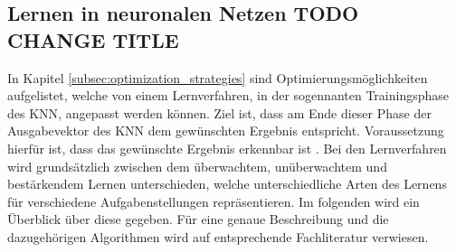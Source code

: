 \subsection{Lernen in neuronalen Netzen TODO CHANGE TITLE}
In Kapitel \ref{subsec:optimization_strategies} sind Optimierungsmöglichkeiten aufgelistet, welche von einem Lernverfahren, in der sogennanten Trainingsphase des \ac{KNN}, angepasst werden können. Ziel ist, dass am Ende dieser Phase der Ausgabevektor des \ac{KNN} dem gewünschten Ergebnis entspricht. Voraussetzung hierfür ist, dass das gewünschte Ergebnis erkennbar ist \cite{zell2003simulation}. Bei den Lernverfahren wird grundsätzlich zwischen dem überwachtem, unüberwachtem und bestärkendem Lernen unterschieden, welche unterschiedliche Arten des Lernens für verschiedene Aufgabenstellungen repräsentieren. Im folgenden wird ein Überblick über diese gegeben. Für eine genaue Beschreibung und die dazugehörigen Algorithmen wird auf entsprechende Fachliteratur verwiesen.

